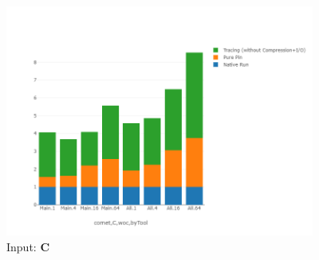 \begin{figure}[!t]
\centering
\includegraphics[width=4in]{figs.comet/comet_chartDet_C_woc_byTool_p3_5.png}
\caption{ Input: \textbf{C}
}
\label{comet_chartDet_C_woc_byTool_p3_5}
\end{figure}



